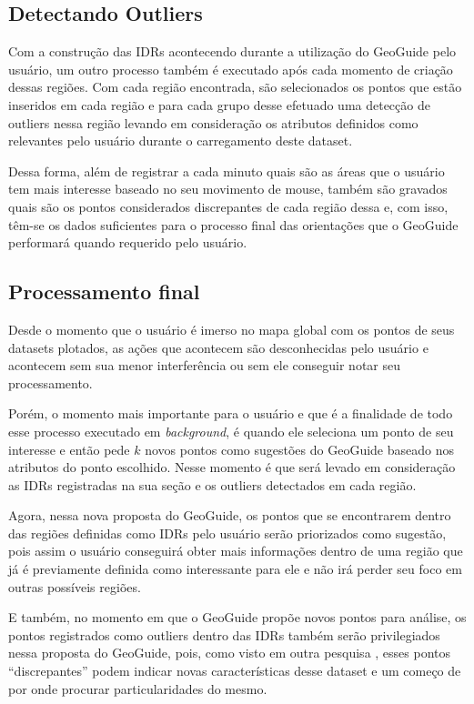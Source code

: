 \subsection{Detectando Outliers}

Com a construção das IDRs acontecendo durante a utilização do GeoGuide pelo usuário, um outro processo também é executado após cada momento de criação dessas regiões. Com cada região encontrada, são selecionados os pontos que estão inseridos em cada região e para cada grupo desse efetuado uma detecção de outliers nessa região levando em consideração os atributos definidos como relevantes pelo usuário durante o carregamento deste dataset.

Dessa forma, além de registrar a cada minuto quais são as áreas que o usuário tem mais interesse baseado no seu movimento de mouse, também são gravados quais são os pontos considerados discrepantes de cada região dessa e, com isso, têm-se os dados suficientes para o processo final das orientações que o GeoGuide performará quando requerido pelo usuário.

\subsection{Processamento final}

Desde o momento que o usuário é imerso no mapa global com os pontos de seus datasets plotados, as ações que acontecem são desconhecidas pelo usuário e acontecem sem sua menor interferência ou sem ele conseguir notar seu processamento.

Porém, o momento mais importante para o usuário e que é a finalidade de todo esse processo executado em \textit{background}, é quando ele seleciona um ponto de seu interesse e então pede $k$ novos pontos como sugestões do GeoGuide baseado nos atributos do ponto escolhido. Nesse momento é que será levado em consideração as IDRs registradas na sua seção e os outliers detectados em cada região.

Agora, nessa nova proposta do GeoGuide, os pontos que se encontrarem dentro das regiões definidas como IDRs pelo usuário serão priorizados como sugestão, pois assim o usuário conseguirá obter mais informações dentro de uma região que já é previamente definida como interessante para ele e não irá perder seu foco em outras possíveis regiões.

E também, no momento em que o GeoGuide propõe novos pontos para análise, os pontos registrados como outliers dentro das IDRs também serão privilegiados nessa proposta do GeoGuide, pois, como visto em outra pesquisa \cite{DBLP:journals/debu/FreireCVZ16}, esses pontos ``discrepantes'' podem indicar novas características desse dataset e um começo de por onde procurar particularidades do mesmo.
